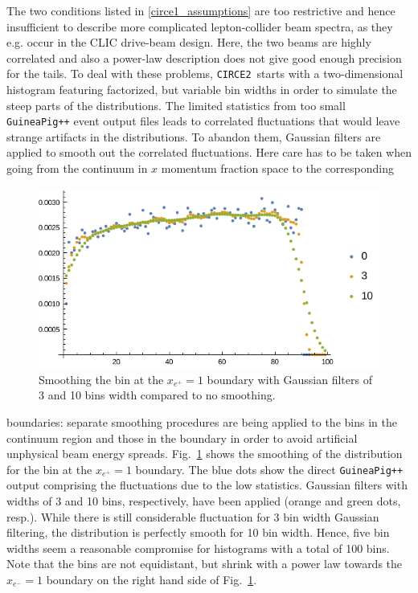 \documentclass[12pt]{book}
\newcommand{\ttt}[1]{\texttt{#1}}
\newcommand{\circetwo}{\ttt{CIRCE2}}
\begin{document}
The two conditions listed in \ref{circe1_assumptions} are too
restrictive and hence insufficient to describe more complicated
lepton-collider beam spectra, as they e.g. occur in the CLIC
drive-beam design. Here, the two beams are highly correlated and also
a power-law description does not give good enough precision for the
tails. To deal with these problems, \circetwo\ starts with a
two-dimensional histogram featuring factorized, but variable bin
widths in order to simulate the steep parts of the
distributions. The limited statistics from too small
\ttt{GuineaPig++} event output files leads to correlated
fluctuations that would leave strange artifacts in the
distributions. To abandon them, Gaussian filters are applied to smooth
out the correlated fluctuations. Here care has to be taken when going
from the continuum in $x$ momentum fraction space to the corresponding
\begin{figure}
  \centering
  \includegraphics{circe2-smoothing}
  \caption{\label{fig:circe2-smoothing}
    Smoothing the bin at the $x_{e^+} = 1$ boundary with Gaussian
    filters of 3 and 10 bins width compared to no smoothing.}
\end{figure}
boundaries: separate smoothing procedures are being applied to the
bins in the continuum region and those in the boundary in order to
avoid artificial unphysical beam energy
spreads. Fig.~\ref{fig:circe2-smoothing} shows the smoothing of the
distribution for the bin at the $x_{e^+} = 1$ boundary. The blue dots
show the direct \ttt{GuineaPig++} output comprising the
fluctuations due to the low statistics. Gaussian filters with widths
of 3 and 10 bins, respectively, have been applied (orange and green
dots, resp.). While there is still considerable fluctuation for 3 bin
width Gaussian filtering, the distribution is perfectly smooth for 10
bin width. Hence, five bin widths seem a reasonable compromise for
histograms with a total of 100 bins. Note that the bins are not
equidistant, but shrink with a power law towards the $x_{e^-} = 1$
boundary on the right hand side of Fig.~\ref{fig:circe2-smoothing}.
\end{document}
